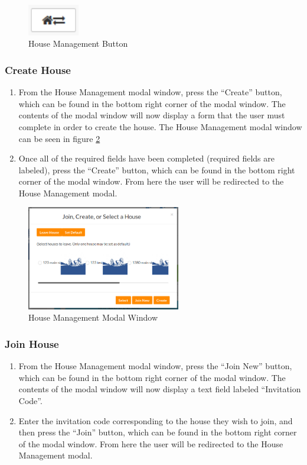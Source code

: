 \documentclass[12pt]{article}
\begin{document}
    \begin{figure}
        \centering
        \includegraphics[width=0.2\textwidth]{house_mgmt_button}
        \caption{House Management Button}
        \label{fig:house_mgmt_button}
    \end{figure}

    \subsubsection{Create House}
    \begin{enumerate}
        \item From the House Management modal window, press the ``Create'' button, which can be found in the bottom right corner of the modal window. The contents of the modal window will now display a form that the user must complete in order to create the house. The House Management modal window can be seen in figure \ref{fig:house_mgmt_modal}
        \item Once all of the required fields have been completed (required fields are labeled), press the ``Create'' button, which can be found in the bottom right corner of the modal window. From here the user will be redirected to the House Management modal.
    \end{enumerate}

    \begin{figure}
        \centering
        \includegraphics[width=0.6\textwidth]{house_mgmt_modal}
        \caption{House Management Modal Window}
        \label{fig:house_mgmt_modal}
    \end{figure}
    
    \subsubsection{Join House}
    \begin{enumerate}
        \item From the House Management modal window, press the ``Join New'' button, which can be found in the bottom right corner of the modal window. The contents of the modal window will now display a text field labeled ``Invitation Code''.
        \item Enter the invitation code corresponding to the house they wish to join, and then press the ``Join'' button, which can be found in the bottom right corner of the modal window. From here the user will be redirected to the House Management modal.
    \end{enumerate}
\end{document}
